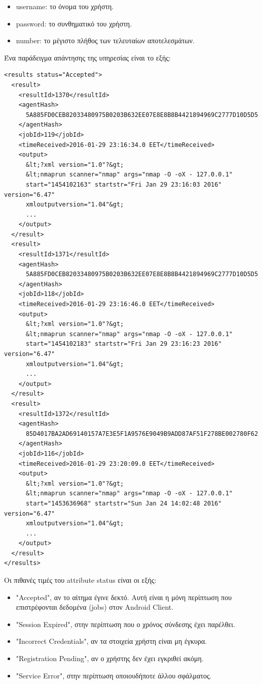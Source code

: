 \documentclass[a4paper,11pt]{article}
\begin{document}
\begin{sloppypar}
\begin{itemize}
\item username: το όνομα του χρήστη.
\item password: το συνθηματικό του χρήστη.
\item number: το μέγιστο πλήθος των τελευταίων αποτελεσμάτων.
\end{itemize}
Ένα παράδειγμα απάντησης της υπηρεσίας είναι το εξής:
\begin{lstlisting}
<results status="Accepted">
  <result>
    <resultId>1370</resultId>
    <agentHash>
      5A885FD0CEB82033480975B0203B632EE07E8E8B8B4421894969C2777D10D5D5
    </agentHash>
    <jobId>119</jobId>
    <timeReceived>2016-01-29 23:16:34.0 EET</timeReceived>
    <output>
      &lt;?xml version="1.0"?&gt;
      &lt;nmaprun scanner="nmap" args="nmap -O -oX - 127.0.0.1"
      start="1454102163" startstr="Fri Jan 29 23:16:03 2016" version="6.47"
      xmloutputversion="1.04"&gt;
      ...
    </output>
  </result>
  <result>
    <resultId>1371</resultId>
    <agentHash>
      5A885FD0CEB82033480975B0203B632EE07E8E8B8B4421894969C2777D10D5D5
    </agentHash>
    <jobId>118</jobId>
    <timeReceived>2016-01-29 23:16:46.0 EET</timeReceived>
    <output>
      &lt;?xml version="1.0"?&gt;
      &lt;nmaprun scanner="nmap" args="nmap -O -oX - 127.0.0.1"
      start="1454102183" startstr="Fri Jan 29 23:16:23 2016" version="6.47"
      xmloutputversion="1.04"&gt;
      ...
    </output>
  </result>
  <result>
    <resultId>1372</resultId>
    <agentHash>
      85D4017BA2AD69140157A7E3E5F1A9576E9049B9ADD87AF51F278BE002780F62
    </agentHash>
    <jobId>116</jobId>
    <timeReceived>2016-01-29 23:20:09.0 EET</timeReceived>
    <output>
      &lt;?xml version="1.0"?&gt;
      &lt;nmaprun scanner="nmap" args="nmap -O -oX - 127.0.0.1"
      start="1453636968" startstr="Sun Jan 24 14:02:48 2016" version="6.47"
      xmloutputversion="1.04"&gt;
      ...
    </output>
  </result>
</results>
\end{lstlisting}

Οι πιθανές τιμές του attribute status είναι οι εξής:
\begin{itemize}
\item "Accepted", αν το αίτημα έγινε δεκτό. Αυτή είναι η μόνη περίπτωση που επιστρέφονται δεδομένα (jobs) στον Android Client.
\item "Session Expired", στην περίπτωση που ο χρόνος σύνδεσης έχει παρέλθει.
\item "Incorrect Credentials", αν τα στοιχεία χρήστη είναι μη έγκυρα.
\item "Registration Pending", αν ο χρήστης δεν έχει εγκριθεί ακόμη.
\item "Service Error", στην περίπτωση οποιουδήποτε άλλου σφάλματος.
\end{itemize}


\end{sloppypar}
\end{document}
